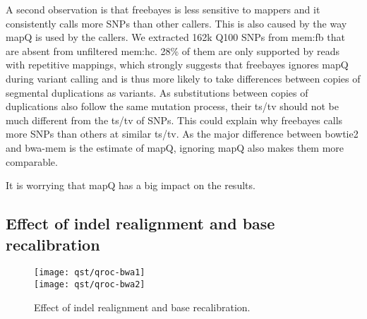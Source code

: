 \documentclass{bioinfo}
\newcommand{\textssf}[1]{\textsf{\footnotesize #1}}
\begin{document}
A second observation is that \textssf{freebayes} is less sensitive to mappers and it
consistently calls more SNPs than other callers. This is also caused by the way
mapQ is used by the callers. We extracted 162k Q100 SNPs from \textssf{mem:fb}
that are absent from unfiltered \textssf{mem:hc}. 28\% of them are only
supported by reads with repetitive mappings, which strongly suggests that
\textssf{freebayes} ignores mapQ during variant calling and is thus more likely
to take differences between copies of segmental duplications as variants. As
substitutions between copies of duplications also follow the same mutation
process, their ts/tv should not be much different from the ts/tv of SNPs. This
could explain why \textssf{freebayes} calls more SNPs than others at similar
ts/tv. As the major difference between \textssf{bowtie2} and \textssf{bwa-mem}
is the estimate of mapQ, ignoring mapQ also makes them more comparable.

It is worrying that mapQ has a big impact on the results.

\subsection{Effect of indel realignment and base recalibration}

\begin{figure}[!hp]
\centering\texttt{[image: qst/qroc-bwa1]}\\
\centering\texttt{[image: qst/qroc-bwa2]}
\caption{Effect of indel realignment and base recalibration.}\label{fig:qroc2} \end{figure}
\end{document}
